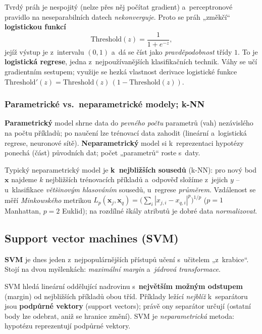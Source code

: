 \begin{intuice}
Tvrdý práh je nespojitý (nelze přes něj počítat gradient) a~perceptronové pravidlo na neseparabilních datech \emph{nekonverguje}. Proto se práh „změkčí`` \textbf{logistickou funkcí}
\[ \mathrm{Threshold}(z) = \frac{1}{1+e^{-z}}, \]
jejíž výstup je z~intervalu $(0,1)$ a~dá se číst jako \emph{pravděpodobnost} třídy $1$. To je \textbf{logistická regrese}, jedna z~nejpoužívanějších klasifikačních technik. Váhy se učí gradientním sestupem; využije se hezká vlastnost derivace logistické funkce $\mathrm{Threshold}'(z)=\mathrm{Threshold}(z)\,(1-\mathrm{Threshold}(z))$.
\end{intuice}

\subsubsection*{Parametrické vs.\ neparametrické modely; k-NN}

\begin{definice}
\textbf{Parametrický} model shrne data do \emph{pevného počtu} parametrů (vah) nezávislého na počtu příkladů; po naučení lze trénovací data zahodit (lineární a~logistická regrese, neuronové sítě). \textbf{Neparametrický} model si k~reprezentaci hypotézy ponechá (část) původních dat; počet „parametrů`` roste s~daty.
\end{definice}

Typický neparametrický model je \textbf{k~nejbližších sousedů} (k-NN): pro nový bod $\mathbf{x}$ najdeme $k$ nejbližších trénovacích příkladů a~odpověď složíme z~jejich $y$ -- u~klasifikace \emph{většinovým hlasováním} sousedů, u~regrese \emph{průměrem}. Vzdálenost se měří \emph{Minkowského} metrikou $L_p(\mathbf{x}_j,\mathbf{x}_q)=\big(\sum_i |x_{j,i}-x_{q,i}|^p\big)^{1/p}$ ($p\!=\!1$ Manhattan, $p\!=\!2$ Euklid); na rozdílné škály atributů je dobré data \emph{normalizovat}.

\subsection{Support vector machines (SVM)}

\textbf{SVM} je dnes jeden z~nejpopulárnějších přístupů učení s~učitelem „z~krabice``. Stojí na dvou myšlenkách: \emph{maximální margin} a~\emph{jádrová transformace}.

\begin{definice}
SVM hledá lineární oddělující nadrovinu s~\textbf{největším možným odstupem} (margin) od nejbližších příkladů obou tříd. Příklady ležící \emph{nejblíž} k~separátoru jsou \textbf{podpůrné vektory} (support vectors); právě ony separátor určují (ostatní body lze odebrat, aniž se hranice změní). SVM je \emph{neparametrická} metoda: hypotézu reprezentují podpůrné vektory.
\end{definice}

